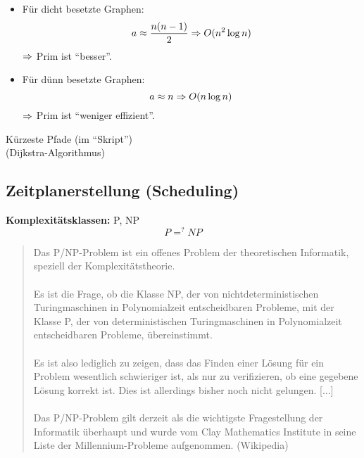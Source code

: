 \documentclass[a4paper]{scrartcl}
\begin{document}


\begin{itemize}
	\item Für dicht besetzte Graphen:
	$$a \approx \frac{n(n-1)}{2} \Rightarrow O(n^2 \log n)$$
	$\Rightarrow$ Prim ist "`besser"'.
	\item Für dünn besetzte Graphen:
	$$a \approx n \Rightarrow O(n \log n) $$
	$\Rightarrow$ Prim ist "`weniger effizient"'.
\end{itemize}
Kürzeste Pfade (im "`Skript"') \\
(Dijkstra-Algorithmus)

\subsection{Zeitplanerstellung (Scheduling)}
\textbf{Komplexitätsklassen:} P, NP
$$P =^? NP$$
\begin{quotation}
Das P/NP-Problem ist ein offenes Problem der theoretischen Informatik, speziell der Komplexitätstheorie. \\
\\
Es ist die Frage, ob die Klasse NP, der von nichtdeterministischen Turingmaschinen in Polynomialzeit entscheidbaren Probleme, mit der Klasse P, der von deterministischen Turingmaschinen in Polynomialzeit entscheidbaren Probleme, übereinstimmt. \\
\\
Es ist also lediglich zu zeigen, dass das Finden einer Lösung für ein Problem wesentlich schwieriger ist, als nur zu verifizieren, ob eine gegebene Lösung korrekt ist. Dies ist allerdings bisher noch nicht gelungen. [...] \\
\\
Das P/NP-Problem gilt derzeit als die wichtigste Fragestellung der Informatik überhaupt und wurde vom Clay Mathematics Institute in seine Liste der Millennium-Probleme aufgenommen. (Wikipedia)
\end{quotation}
\end{document}
